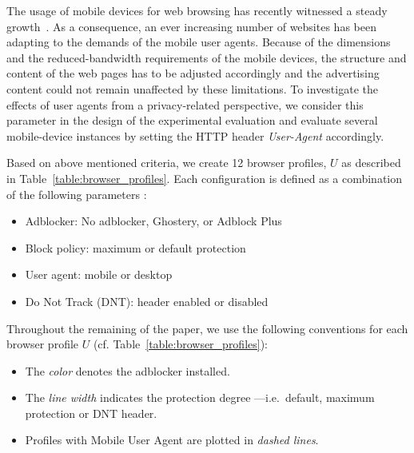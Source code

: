\documentclass[compsoc, conference, letterpaper, 10pt, times]{IEEEtran}
\begin{document}
The usage of mobile devices for web browsing has recently witnessed a steady growth~\cite{mobile_usage}. As a consequence, an ever increasing number of websites has been adapting to the demands of the mobile user agents. Because of the dimensions and the reduced-bandwidth requirements of the mobile devices, the structure and content of the web pages has to be adjusted accordingly and the advertising content could not remain unaffected by these limitations. To investigate the effects of user agents from a privacy-related perspective, we consider this parameter in the design of the experimental evaluation and evaluate several mobile-device instances by setting the HTTP header \textit{User-Agent} accordingly.

Based on above mentioned criteria, we create 12 browser profiles, $U$ as described in Table~\ref{table:browser_profiles}. Each configuration is defined as a combination of the following parameters :
\begin{itemize}
 \item Adblocker: No adblocker, Ghostery, or Adblock Plus
 \item Block policy: maximum or default protection
 \item User agent: mobile or desktop
 \item Do Not Track (DNT): header enabled or disabled
\end{itemize}
Throughout the remaining of the paper, we use the following conventions for each browser profile $U$ (cf. Table~\ref{table:browser_profiles}):
\begin{itemize}
 \item The \textit{color} denotes the adblocker installed.
 \item The \textit{line width} indicates the protection degree ---i.e.\ default, maximum protection or DNT header.
 \item Profiles with Mobile User Agent are plotted in \textit{dashed lines}.
\end{itemize}
\end{document}
